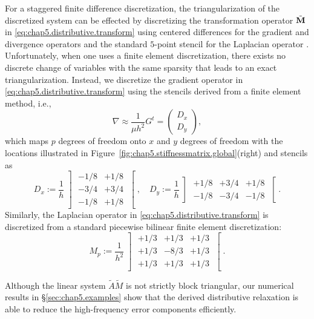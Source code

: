 For a staggered finite difference discretization, the triangularization of the discretized system can be effected by discretizing the transformation operator $\tilde{\mathbf{M}}$ in \eqref{eq:chap5.distributive.transform} using centered
differences for the gradient and divergence operators and the standard $5$-point stencil for the Laplacian operator \cite{Zhu.Yongning10}. Unfortunately, when one uses a finite element discretization, there exists no discrete change of variables with the same sparsity that leads to an exact triangularization. Instead, we discretize the gradient operator in
\eqref{eq:chap5.distributive.transform} using the stencils derived from a finite element method, i.e.,
\begin{equation*}
\nabla \approx \frac{1}{\mu h^2} G^t = \begin{pmatrix} D_x \\ D_y \end{pmatrix},
\end{equation*}
which maps $p$ degrees of freedom onto $x$ and $y$ degrees of freedom with the locations illustrated in Figure~\ref{fig:chap5.stiffnessmatrix.global}(right) and stencils as
\begin{equation*}
D_x := \frac{1}{h}
\left] \begin{matrix} -1/8 & +1/8 \\ -3/4 & +3/4 \\ -1/8 & +1/8 \end{matrix} \right[, \quad
D_y := \frac{1}{h}
\left] \begin{matrix} +1/8 & +3/4 & +1/8 \\ -1/8 & -3/4 & -1/8 \end{matrix} \right[.
\end{equation*}
Similarly, the Laplacian operator in \eqref{eq:chap5.distributive.transform} is discretized from a standard piecewise bilinear finite element discretization:
\begin{equation*}
M_p := \frac{1}{h^2} \left] \begin{matrix} +1/3 & +1/3 & +1/3 \\ +1/3 & -8/3 & +1/3 \\ +1/3 & +1/3 & +1/3 \end{matrix} \right[.
\end{equation*}

Although the linear system $\tilde{A} \tilde{M}$ is not strictly block triangular, our numerical results in \S\ref{sec:chap5.examples} show that the derived distributive relaxation is able to reduce the high-frequency error components efficiently.

